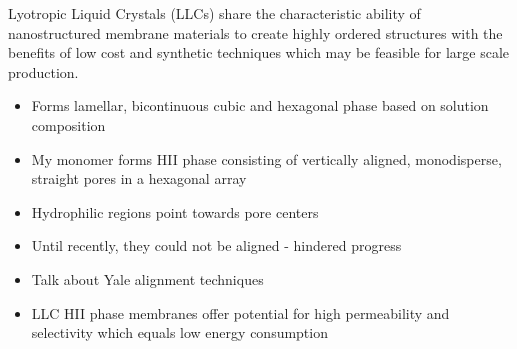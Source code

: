 \documentclass{article}
\begin{document}
Lyotropic Liquid Crystals (LLCs) share the characteristic ability of nanostructured membrane materials to create highly ordered structures with the benefits of low cost and synthetic techniques which may be feasible for large scale production.
\begin{itemize}
	\item Forms lamellar, bicontinuous cubic and hexagonal phase based on solution composition
	\item My monomer forms HII phase consisting of vertically aligned, monodisperse, straight pores in a hexagonal array
	\item Hydrophilic regions point towards pore centers
	\item Until recently, they could not be aligned - hindered progress
	\item Talk about Yale alignment techniques
	\item LLC HII phase membranes offer potential for high permeability and selectivity which equals low energy consumption
\end{itemize}
\end{document}
